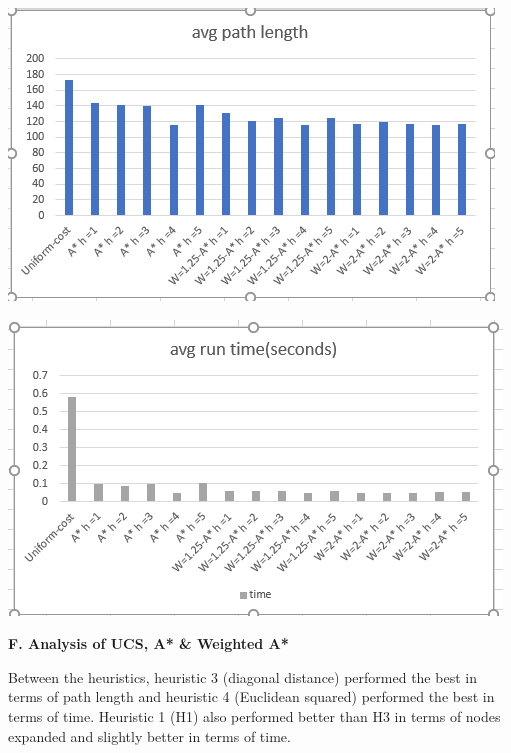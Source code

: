 \documentclass[12pt, letterpaper]{article}
\begin{document}
\medskip

\noindent \includegraphics[scale=0.8]{"avg-pathlength"}

\medskip

\noindent \includegraphics[scale=0.8]{"avg-runtime"}

\medskip

\pagebreak %

\noindent \textbf{F. Analysis of UCS, A* \& Weighted A*}

Between the heuristics, heuristic 3 (diagonal distance) performed the best in terms of path length and heuristic 4 (Euclidean squared) performed the best in terms of time. Heuristic 1 (H1) also performed better than H3 in terms of nodes expanded and slightly better in terms of time. 
\end{document}
